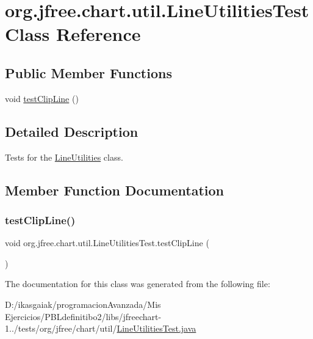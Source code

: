 \hypertarget{classorg_1_1jfree_1_1chart_1_1util_1_1_line_utilities_test}{}\section{org.\+jfree.\+chart.\+util.\+Line\+Utilities\+Test Class Reference}
\label{classorg_1_1jfree_1_1chart_1_1util_1_1_line_utilities_test}
\subsection*{Public Member Functions}
\begin{DoxyCompactItemize}
\item 
void \mbox{\hyperlink{classorg_1_1jfree_1_1chart_1_1util_1_1_line_utilities_test_a206b6532d159a846314e509c3ca45cf2}{test\+Clip\+Line}} ()
\end{DoxyCompactItemize}


\subsection{Detailed Description}
Tests for the \mbox{\hyperlink{classorg_1_1jfree_1_1chart_1_1util_1_1_line_utilities}{Line\+Utilities}} class. 

\subsection{Member Function Documentation}
\mbox{\label{classorg_1_1jfree_1_1chart_1_1util_1_1_line_utilities_test_a206b6532d159a846314e509c3ca45cf2}} 
\subsubsection{\texorpdfstring{test\+Clip\+Line()}{testClipLine()}}
{\footnotesize\ttfamily void org.\+jfree.\+chart.\+util.\+Line\+Utilities\+Test.\+test\+Clip\+Line (\begin{DoxyParamCaption}{ }\end{DoxyParamCaption})}



The documentation for this class was generated from the following file\+:\begin{DoxyCompactItemize}
\item 
D\+:/ikasgaiak/programacion\+Avanzada/\+Mis Ejercicios/\+P\+B\+Ldefinitibo2/libs/jfreechart-\/1../tests/org/jfree/chart/util/\mbox{\hyperlink{_line_utilities_test_8java}{Line\+Utilities\+Test.\+java}}\end{DoxyCompactItemize}
